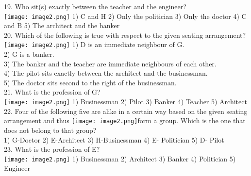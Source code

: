 \documentclass[
]{article}
\begin{document}
19. Who sit(s) exactly between the teacher and the engineer?\\
\texttt{[image: image2.png]}
1) C and H \hspace{2mm}2) Only the politician \hspace{2mm}3) Only the doctor
\hspace{2mm}4) C and B \hspace{2mm}5) The architect and the banker\\

20. Which of the following is true with respect to the given seating arrangement?\\
\texttt{[image: image2.png]}
1) D is an immediate neighbour of G.\\
2) G is a banker.\\
3) The banker and the teacher are immediate neighbours of each other.\\
4) The pilot sits exactly between the architect and the businessman.\\
5) The doctor sits second to the right of the businessman.\\

21. What is the profession of G?\\
\texttt{[image: image2.png]}
1) Businessman \hspace{2mm}2) Pilot \hspace{2mm}3) Banker \hspace{2mm}4) Teacher \hspace{2mm}5) Architect\\

22. Four of the following five are alike in a certain way based on the given seating
arrangement and thus \texttt{[image: image2.png]}form a group. Which is the one that does not belong to that group?\\
1) G-Doctor \hspace{2mm}2) E-Architect \hspace{2mm}3) H-Businessman
\hspace{2mm}4) E- Politician \hspace{2mm}5) D- Pilot\\

23. What is the profession of E?\\
\texttt{[image: image2.png]}
1) Businessman \hspace{2mm}2) Architect \hspace{2mm}3) Banker \hspace{2mm}4) Politician \hspace{2mm}5) Engineer\\
\end{document}
